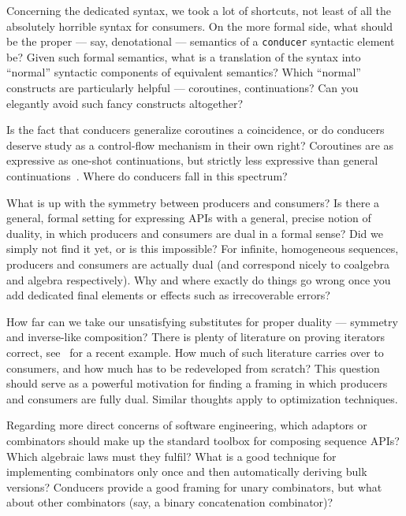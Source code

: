 \documentclass[sigplan,screen,10pt,review]{acmart}
\begin{document}
Concerning the dedicated syntax, we took a lot of shortcuts, not least of all the absolutely horrible syntax for consumers. On the more formal side, what should be the proper --- say, denotational --- semantics of a \texttt{conducer} syntactic element be? Given such formal semantics, what is a translation of the syntax into ``normal'' syntactic components of equivalent semantics? Which ``normal'' constructs are particularly helpful --- coroutines, continuations? Can you elegantly avoid such fancy constructs altogether?

Is the fact that conducers generalize coroutines a coincidence, or do conducers deserve study as a control-flow mechanism in their own right? Coroutines are as expressive as one-shot continuations, but strictly less expressive than general continuations~\cite{moura2009revisiting}. Where do conducers fall in this spectrum?

What is up with the symmetry between producers and consumers? Is there a general, formal setting for expressing APIs with a general, precise notion of duality, in which producers and consumers are dual in a formal sense? Did we simply not find it yet, or is this impossible? For infinite, homogeneous sequences, producers and consumers are actually dual (and correspond nicely to coalgebra and algebra respectively). Why and where exactly do things go wrong once you add dedicated final elements or effects such as irrecoverable errors?

How far can we take our unsatisfying substitutes for proper duality --- symmetry and inverse-like composition? There is plenty of literature on proving iterators correct, see~\cite{bily2022compositional} for a recent example. How much of such literature carries over to consumers, and how much has to be redeveloped from scratch? This question should serve as a powerful motivation for finding a framing in which producers and consumers are fully dual. Similar thoughts apply to optimization techniques.

Regarding more direct concerns of software engineering, which adaptors or combinators should make up the standard toolbox for composing sequence APIs? Which algebraic laws must they fulfil? What is a good technique for implementing combinators only once and then automatically deriving bulk versions? Conducers provide a good framing for unary combinators, but what about other combinators (say, a binary concatenation combinator)?
\end{document}
